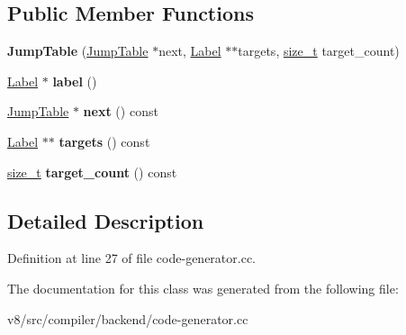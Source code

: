 \subsection*{Public Member Functions}
\begin{DoxyCompactItemize}
\item 
\mbox{\label{classv8_1_1internal_1_1compiler_1_1CodeGenerator_1_1JumpTable_a0ede21dd9ee3589d4913b499fe823d52}} 
{\bfseries Jump\+Table} (\mbox{\hyperlink{classv8_1_1internal_1_1compiler_1_1CodeGenerator_1_1JumpTable}{Jump\+Table}} $\ast$next, \mbox{\hyperlink{classv8_1_1internal_1_1Label}{Label}} $\ast$$\ast$targets, \mbox{\hyperlink{classsize__t}{size\+\_\+t}} target\+\_\+count)
\item 
\mbox{\label{classv8_1_1internal_1_1compiler_1_1CodeGenerator_1_1JumpTable_aa0954aa55cf8ed4efaf0931b730c0d1d}} 
\mbox{\hyperlink{classv8_1_1internal_1_1Label}{Label}} $\ast$ {\bfseries label} ()
\item 
\mbox{\label{classv8_1_1internal_1_1compiler_1_1CodeGenerator_1_1JumpTable_a523191ee995fb4492315bb559936d0cd}} 
\mbox{\hyperlink{classv8_1_1internal_1_1compiler_1_1CodeGenerator_1_1JumpTable}{Jump\+Table}} $\ast$ {\bfseries next} () const
\item 
\mbox{\label{classv8_1_1internal_1_1compiler_1_1CodeGenerator_1_1JumpTable_aaac8a4ad2bdc74dbc3afc19c6fe7c5bd}} 
\mbox{\hyperlink{classv8_1_1internal_1_1Label}{Label}} $\ast$$\ast$ {\bfseries targets} () const
\item 
\mbox{\label{classv8_1_1internal_1_1compiler_1_1CodeGenerator_1_1JumpTable_a082c977aa7708ead2a1499e02d81f069}} 
\mbox{\hyperlink{classsize__t}{size\+\_\+t}} {\bfseries target\+\_\+count} () const
\end{DoxyCompactItemize}


\subsection{Detailed Description}


Definition at line 27 of file code-\/generator.\+cc.



The documentation for this class was generated from the following file\+:\begin{DoxyCompactItemize}
\item 
v8/src/compiler/backend/code-\/generator.\+cc\end{DoxyCompactItemize}
